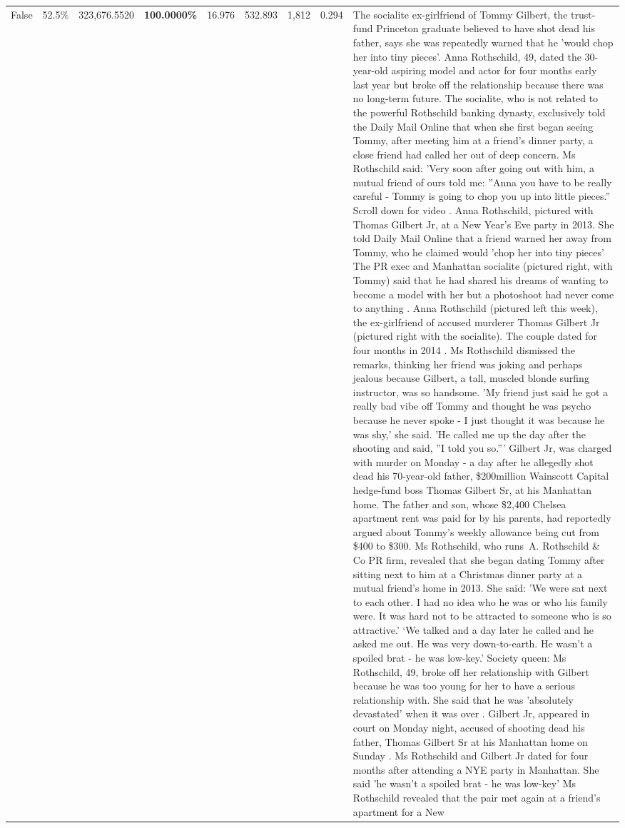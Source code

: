 \begin{table}[H]
\begin{tabular}{lllrlllll}
False & 52.5\% & 323,676.5520 & \bfseries \color{red} 100.0000\% & 16.976 & 532.893 & 1,812 & 0.294 & The socialite ex-girlfriend of Tommy Gilbert, the trust-fund Princeton graduate believed to have shot dead his father, says she was repeatedly warned that he 'would chop her into tiny pieces'. Anna Rothschild, 49, dated the 30-year-old aspiring model and actor for four months early last year but broke off the relationship because there was no long-term future. The socialite, who is not related to the powerful Rothschild banking dynasty, exclusively told the Daily Mail Online that when she first began seeing Tommy, after meeting him at a friend's dinner party, a close friend had called her out of deep concern. Ms Rothschild said: 'Very soon after going out with him, a mutual friend of ours told me: ''Anna you have to be really careful - Tommy is going to chop you up into little pieces.'' Scroll down for video . Anna Rothschild, pictured with Thomas Gilbert Jr, at a New Year's Eve party in 2013. She told Daily Mail Online that a friend warned her away from Tommy, who he claimed would 'chop her into tiny pieces' The PR exec and Manhattan socialite (pictured right, with Tommy) said that he had shared his dreams of wanting to become a model with her but a photoshoot had never come to anything . Anna Rothschild (pictured left this week), the ex-girlfriend of accused murderer Thomas Gilbert Jr (pictured right with the socialite). The couple dated for four months in 2014 . Ms Rothschild dismissed the remarks, thinking her friend was joking and perhaps jealous because Gilbert, a tall, muscled blonde surfing instructor, was so handsome. 'My friend just said he got a really bad vibe off Tommy and thought he was psycho because he never spoke - I just thought it was because he was shy,' she said. 'He called me up the day after the shooting and said, ''I told you so.''' Gilbert Jr, was charged with murder on Monday - a day after he allegedly shot dead his 70-year-old father, \$200million Wainscott Capital hedge-fund boss Thomas Gilbert Sr, at his Manhattan home. The father and son, whose \$2,400 Chelsea apartment rent was paid for by his parents, had reportedly argued about Tommy's weekly allowance being cut from \$400 to \$300. Ms Rothschild, who runs A. Rothschild \& Co PR firm, revealed that she began dating Tommy after sitting next to him at a Christmas dinner party at a mutual friend's home in 2013. She said: 'We were sat next to each other. I had no idea who he was or who his family were. It was hard not to be attracted to someone who is so attractive.' ‘We talked and a day later he called and he asked me out. He was very down-to-earth. He wasn’t a spoiled brat - he was low-key.’ Society queen: Ms Rothschild, 49, broke off her relationship with Gilbert because he was too young for her to have a serious relationship with. She said that he was 'absolutely devastated' when it was over . Gilbert Jr, appeared in court on Monday night, accused of shooting dead his father, Thomas Gilbert Sr at his Manhattan home on Sunday . Ms Rothschild and Gilbert Jr dated for four months after attending a NYE party in Manhattan. She said 'he wasn't a spoiled brat - he was low-key' Ms Rothschild revealed that the pair met again at a friend’s apartment for a New 
\end{tabular}
\end{table}
